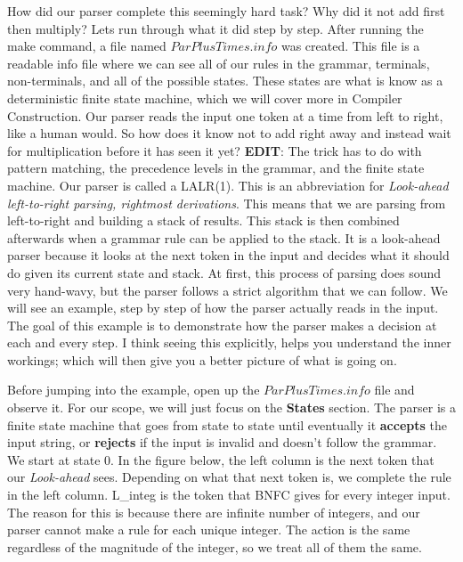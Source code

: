 \documentclass{article}
\begin{document}
\medskip\noindent
How did our parser complete this seemingly hard task? Why did it not add first then multiply? Lets run through what it did step by step. After running the make command, a file named $ParPlusTimes.info$ was created. This file is a readable info file where we can see all of our rules in the grammar, terminals, non-terminals, and all of the possible states. These states are what is know as a deterministic finite state machine, which we will cover more in Compiler Construction. Our parser reads the input one token at a time from left to right, like a human would. So how does it know not to add right away and instead wait for multiplication before it has seen it yet?
\textbf{EDIT}: The trick has to do with pattern matching, the precedence levels in the grammar, and the finite state machine. Our parser is called a LALR(1). This is an abbreviation for \textit{Look-ahead left-to-right parsing, rightmost derivations}. This means that we are parsing from left-to-right and building a stack of results. This stack is then combined afterwards when a grammar rule can be applied to the stack. It is a look-ahead parser because it looks at the next token in the input and decides what it should do given its current state and stack. At first, this process of parsing does sound very hand-wavy, but the parser follows a strict algorithm that we can follow. We will see an example, step by step of how the parser actually reads in the input. The goal of this example is to demonstrate how the parser makes a decision at each and every step. I think seeing this explicitly, helps you understand the inner workings; which will then give you a better picture of what is going on.

\medskip\noindent
Before jumping into the example, open up the $ParPlusTimes.info$ file and observe it. For our scope, we will just focus on the \textbf{States} section. The parser is a finite state machine that goes from state to state until eventually it \textbf{accepts} the input string, or \textbf{rejects} if the input is invalid and doesn't follow the grammar. We start at state 0. In the figure below, the left column is the next token that our \textit{Look-ahead} sees. Depending on what that next token is, we complete the rule in the left column. L\_integ is the token that BNFC gives for every integer input. The reason for this is because there are infinite number of integers, and our parser cannot make a rule for each unique integer. The action is the same regardless of the magnitude of the integer, so we treat all of them the same.
\end{document}
